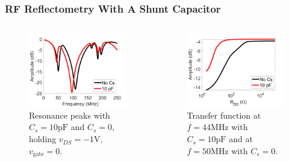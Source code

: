 \documentclass{beamer}
\begin{document}
\begin{frame}
    \frametitle{RF Reflectometry With A Shunt Capacitor}

    \begin{columns}
        \begin{column}{0.5\textwidth}
            \begin{figure}
                \includegraphics[width = 1.1\textwidth]{matlab_cs10_resonance.png}
                \caption{Resonance peaks with $C_s = 10\si{\pico\farad}$ and $C_s = 0$, holding $v_{DS} = -1\si{\volt}$, $v_\mathrm{gate}=0$.}
                \label{fig:cs10res}
            \end{figure}
        \end{column}
        \begin{column}{0.5\textwidth}
            \begin{figure}
                \includegraphics[width = 1.1\textwidth]{matlab_cs10_transfer.png}
                \caption{Transfer function at $f = 44\si{\mega\hertz}$ with $C_s = 10\si{\pico\farad}$ and at $f=50\si{\mega\hertz}$ with $C_s = 0$.}
                \label{fig:cs10transfer}
            \end{figure}
        \end{column}
    \end{columns}
\end{frame}
\end{document}

